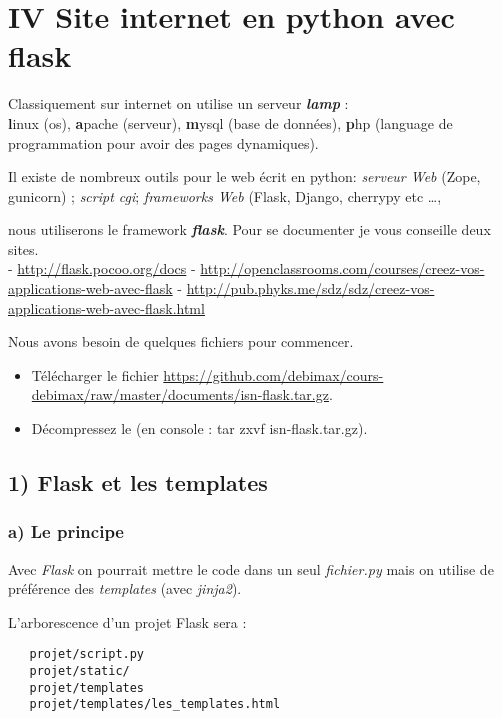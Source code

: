 \documentclass{article}
\begin{document}
    \section{IV Site internet en python avec flask~}


    Classiquement sur internet on utilise un serveur \textbf{\emph{lamp}}
:\\\textbf{l}inux (os), \textbf{a}pache (serveur), \textbf{m}ysql (base
de données), \textbf{p}hp (language de programmation pour avoir des
pages dynamiques).

Il existe de nombreux outils pour le web écrit en python: \emph{serveur
Web} (Zope, gunicorn) ; \emph{script cgi}; \emph{frameworks Web} (Flask,
Django, cherrypy etc \ldots{},

nous utiliserons le framework \textbf{\emph{flask}}. Pour se documenter
je vous conseille deux sites.\\- \url{http://flask.pocoo.org/docs} -
\url{http://openclassrooms.com/courses/creez-vos-applications-web-avec-flask}
-
\url{http://pub.phyks.me/sdz/sdz/creez-vos-applications-web-avec-flask.html}

Nous avons besoin de quelques fichiers pour commencer.

\begin{itemize}
\itemsep1pt\parskip0pt
\item
  Télécharger le fichier
  \url{https://github.com/debimax/cours-debimax/raw/master/documents/isn-flask.tar.gz}.
\item
  Décompressez le (en console : tar zxvf isn-flask.tar.gz).
\end{itemize}

    \subsection{1) Flask et les templates}\label{flask-et-les-templates}

\subsubsection{a) Le principe}\label{a-le-principe}

Avec \emph{Flask} on pourrait mettre le code dans un seul
\emph{fichier.py} mais on utilise de préférence des \emph{templates}
(avec \emph{jinja2}).

L'arborescence d'un projet Flask sera :

\begin{verbatim}
   projet/script.py
   projet/static/
   projet/templates
   projet/templates/les_templates.html
\end{verbatim}
\end{document}
